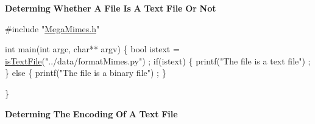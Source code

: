 {\bfseries Determing} {\bfseries Whether} {\bfseries A} {\bfseries File} {\bfseries Is} {\bfseries A} {\bfseries Text} {\bfseries File} {\bfseries Or} {\bfseries Not} 
\begin{DoxyCode}
\textcolor{preprocessor}{#include "\hyperlink{MegaMimes_8h}{MegaMimes.h}"}

\textcolor{keywordtype}{int} main(\textcolor{keywordtype}{int} argc, \textcolor{keywordtype}{char}** argv)
\{
    \textcolor{keywordtype}{bool} istext = \hyperlink{MegaMimes_8h_a7f254e9556aef5fd8697299271f612f4}{isTextFile}(\textcolor{stringliteral}{"../data/formatMimes.py"}) ;
    \textcolor{keywordflow}{if}(istext)
    \{
        printf(\textcolor{stringliteral}{"The file is a text file"}) ;
    \}
    \textcolor{keywordflow}{else}
    \{
        printf(\textcolor{stringliteral}{"The file is a binary file"}) ;
    \}
 
\}
\end{DoxyCode}


{\bfseries Determing} {\bfseries The} {\bfseries Encoding} {\bfseries Of} {\bfseries A} {\bfseries Text} {\bfseries File} 
 